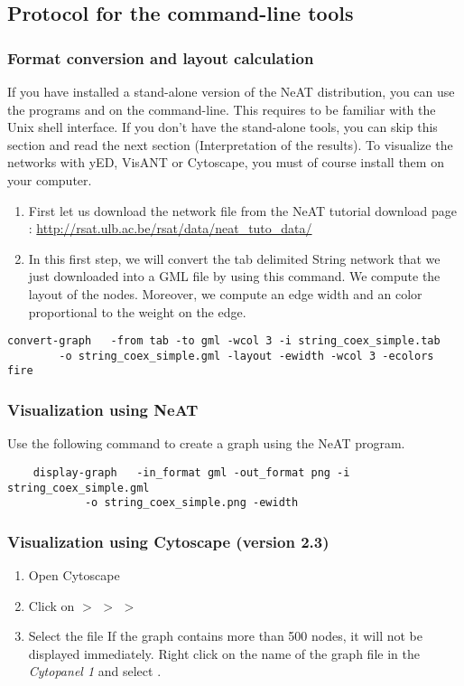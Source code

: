 \subsection{Protocol for the command-line tools}
\subsubsection{Format conversion and layout calculation}
If you have installed a stand-alone version of the NeAT distribution,
you can use the programs  and  on the
command-line. This requires to be familiar with the Unix shell
interface. If you don't have the stand-alone tools, you can skip this
section and read the next section (Interpretation of the results). To visualize the networks with yED, VisANT or Cytoscape, you
must of course install them on your computer.


\begin{enumerate}
\item First let us download the network file  from the NeAT tutorial download page : \url{http://rsat.ulb.ac.be/rsat/data/neat\_tuto\_data/} 
\item In this first step, we will convert the tab delimited String network that we just downloaded into a GML file by using this command. We compute the layout of the nodes. Moreover, we compute an edge width and an color proportional to the weight on the edge.

\end{enumerate}
\lstset{language=csh}
\begin{lstlisting}
convert-graph 	-from tab -to gml -wcol 3 -i string_coex_simple.tab 
		-o string_coex_simple.gml -layout -ewidth -wcol 3 -ecolors fire
\end{lstlisting}

\subsubsection{Visualization using NeAT}
Use the following command to create a graph using the NeAT  program.
\begin{lstlisting}
	display-graph 	-in_format gml -out_format png -i string_coex_simple.gml
			-o string_coex_simple.png -ewidth
\end{lstlisting}


\subsubsection{Visualization using Cytoscape (version 2.3)}
\begin{enumerate}
 \item Open Cytoscape
 \item Click on  $>$   $>$  $>$  
 \item Select the file 
If the graph contains more than 500 nodes, it will not be displayed immediately. Right click on the name of the graph file in the \textit{Cytopanel 1} and select .
\end{enumerate}

